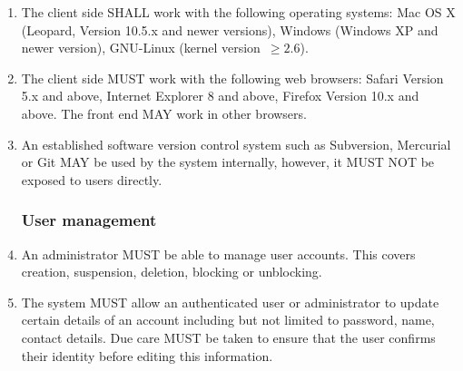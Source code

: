 \begin{enumerate}[1]
\item The client side SHALL work with the following operating systems: Mac OS X (Leopard, Version 10.5.x and newer versions), Windows (Windows XP and newer version), GNU-Linux (kernel version~$\ge 2.6$).

\item The client side MUST work with the following web browsers: Safari Version 5.x and above, Internet Explorer 8 and above, Firefox Version 10.x and above. The front end MAY work in other browsers.

\item An established software version control system such as Subversion, Mercurial or Git MAY be used by the system internally, however, it MUST NOT be exposed to users directly.

\subsubsection{User management}
\item An administrator MUST be able to manage user accounts. This covers creation, suspension, deletion, blocking or unblocking.

\item The system MUST allow an authenticated user or administrator to update certain details of an account including but not limited to password, name, contact details. Due care MUST be taken to ensure that the user confirms their identity before editing this information.
\end{enumerate}

